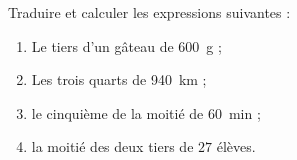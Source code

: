 
\begin{exercice}\label{exosmath-0877}

Traduire et calculer les expressions suivantes :
\begin{enumerate}
    \item
        Le tiers d'un gâteau de \SI{600}{\gram} ;
 \item
     Les trois quarts de \SI{940}{\kilo\meter} ;
 \item
     le cinquième de la moitié de \SI{60}{\minute} ;
 \item
 la moitié des deux tiers de $27$ élèves.
\end{enumerate}

\end{exercice}
